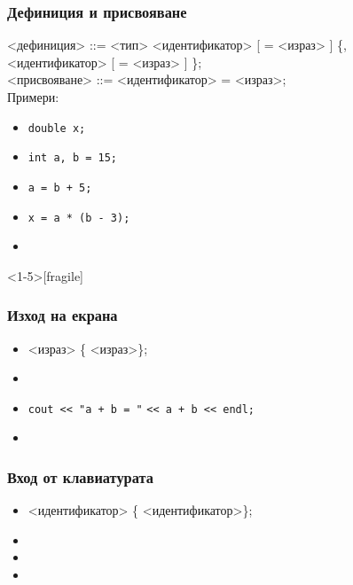 \documentclass[alsotrans]{beamerswitch}
\begin{document}
\begin{frame}[fragile]
  \frametitle{Дефиниция и присвояване}
<дефиниция> ::= <тип>
<идентификатор> [ \tta= <израз> ] \{\tta,\\
\hspace{25ex}
<идентификатор> [ \tta= <израз> ] \}\tta;\\[2em]
<присвояване> ::= <идентификатор> \tta= <израз>\tta;\\[2em]
\pause
Примери:
\begin{itemize}
\item \lstinline{double x;}
\item \lstinline{int a, b = 15;}
\item \lstinline{a = b + 5;}
\item \lstinline{x = a * (b - 3);}
\item {}
\end{itemize}
\end{frame}

\begin{frame}<1-5>[fragile]
  \frametitle{Изход на екрана}

  \begin{fixedarea}[.5]
    \begin{itemize}
    \item {} <израз> \{\tta{<{}<} <израз>\}\tta;
    \item {}
    \item<4-> \lstinline{cout << "a + b = "} \lstinline{<< a + b << endl;}
    \item<5-> 
    \end{itemize}
  \end{fixedarea}
\end{frame}

\begin{frame}
  \frametitle{Вход от клавиатурата}

  \begin{fixedarea}[.5]
    \begin{itemize}
    \item {} <идентификатор> \{\tta{>{}>} <идентификатор>\}\tta;
    \item {}
    \item<4-> 
    \item<5-> 
    \end{itemize}
  \end{fixedarea}
\end{frame}
\end{document}
